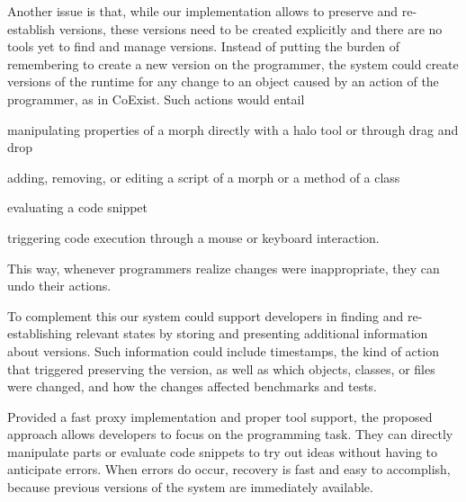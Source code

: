 \documentclass{sigplanconf}
\newcommand{\coexist}{CoExist\xspace}
\begin{document}
Another issue is that, while our implementation allows to preserve and re-establish versions, these versions need to be created explicitly and there are no tools yet to find and manage versions.
Instead of putting the burden of remembering to create a new version on the programmer, the system could create versions of the runtime for any change to an object caused by an action of the programmer, as in \coexist.
Such actions would entail
\begin{inparaenum}[a)]
    \item manipulating properties of a morph directly with a halo tool or through drag and drop
    \item adding, removing, or editing a script of a morph or a method of a class
    \item evaluating a code snippet
    \item triggering code execution through a mouse or keyboard interaction.
\end{inparaenum}
This way, whenever programmers realize changes were inappropriate, they can undo their actions.

To complement this our system could support developers in
finding and re-establishing relevant states by storing and presenting
additional information about versions. Such information could include
timestamps, the kind of action that triggered preserving the version,
as well as which objects, classes, or files were changed, and how the
changes affected benchmarks and tests.

Provided a fast proxy implementation and proper tool support, the
proposed approach allows developers to focus on the programming task.
They can directly manipulate parts or evaluate code snippets to try
out ideas without having to anticipate errors. When errors do occur,
recovery is fast and easy to accomplish, because previous versions of
the system are immediately available.
\end{document}
